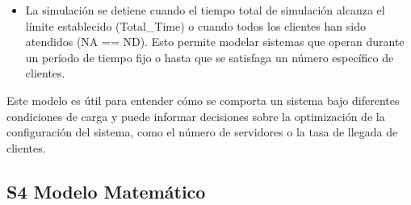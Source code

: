 \documentclass[
]{article}
\providecommand{\tightlist}{%
  \setlength{\itemsep}{0pt}\setlength{\parskip}{0pt}}
\begin{document}
\begin{itemize}
  \begin{itemize}
  \tightlist
  \item
    La simulación se detiene cuando el tiempo total de simulación
    alcanza el límite establecido (Total\_Time) o cuando todos los
    clientes han sido atendidos (NA == ND). Esto permite modelar
    sistemas que operan durante un período de tiempo fijo o hasta que se
    satisfaga un número específico de clientes.
  \end{itemize}

  Este modelo es útil para entender cómo se comporta un sistema bajo
  diferentes condiciones de carga y puede informar decisiones sobre la
  optimización de la configuración del sistema, como el número de
  servidores o la tasa de llegada de clientes.
\end{itemize}

\hypertarget{s4-modelo-matemuxe1tico}{%
\subsection{S4 Modelo Matemático}\label{s4-modelo-matemuxe1tico}}
\end{document}
